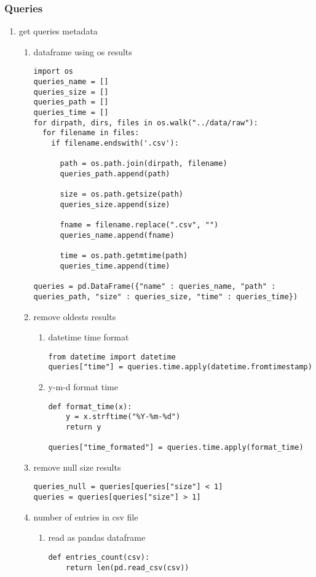 \documentclass[11pt]{article}
\begin{document}
\subsubsection{Queries}
\label{sec:org786efe9}
\begin{enumerate}
\item get queries metadata
\label{sec:orgc5f46d8}
\begin{enumerate}
\item dataframe using os results
\label{sec:orgd72c48a}
\begin{verbatim}
import os
queries_name = []
queries_size = []
queries_path = []
queries_time = []
for dirpath, dirs, files in os.walk("../data/raw"): 
  for filename in files:
    if filename.endswith('.csv'):

      path = os.path.join(dirpath, filename)
      queries_path.append(path)

      size = os.path.getsize(path)
      queries_size.append(size)

      fname = filename.replace(".csv", "")
      queries_name.append(fname)

      time = os.path.getmtime(path)
      queries_time.append(time)

queries = pd.DataFrame({"name" : queries_name, "path" : queries_path, "size" : queries_size, "time" : queries_time})      
\end{verbatim}
\item remove oldests results
\label{sec:orgcf1382c}
\begin{enumerate}
\item datetime time format
\label{sec:org3f01de2}
\begin{verbatim}
from datetime import datetime
queries["time"] = queries.time.apply(datetime.fromtimestamp)
\end{verbatim}

\item y-m-d format time
\label{sec:orge9b0b21}
\begin{verbatim}
def format_time(x):
    y = x.strftime("%Y-%m-%d")
    return y

queries["time_formated"] = queries.time.apply(format_time)
\end{verbatim}
\end{enumerate}
\item remove null size results
\label{sec:orge33b0ab}
\begin{verbatim}
queries_null = queries[queries["size"] < 1]
queries = queries[queries["size"] > 1]
\end{verbatim}
\item number of entries in csv file
\label{sec:orgb1c7557}
\begin{enumerate}
\item read as pandas dataframe
\label{sec:org6f531de}
\begin{verbatim}
def entries_count(csv):
    return len(pd.read_csv(csv))


\end{verbatim}
\end{enumerate}
\end{enumerate}
\end{enumerate}
\end{document}
